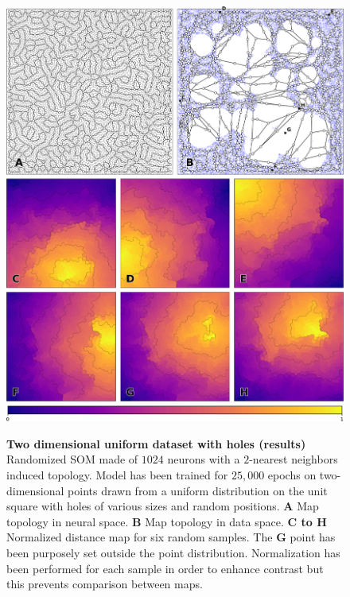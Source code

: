 \begin{figure}
  \includegraphics[width=\columnwidth]{experiment-2D-holes.pdf}
  \vspace{2mm}
  \includegraphics[width=\columnwidth]{figures/colormap.pdf}
  \caption{%
  {\bfseries \sffamily Two dimensional uniform dataset with holes (results)}
  Randomized SOM made of $1024$ neurons with a $2$-nearest neighbors induced topology. Model has been trained for $25,000$ epochs on two-dimensional points drawn from a uniform distribution on the unit square with holes of various sizes and random positions. \textbf{A} Map topology in neural space. \textbf{B} Map topology in data space. \textbf{C to H} Normalized distance map for six random samples. The \textbf{G} point has been purposely set outside the point distribution. Normalization has been performed for each sample in order to enhance contrast but this prevents comparison between maps.
  }
  \label{fig:2D-holes:results}
\end{figure}

